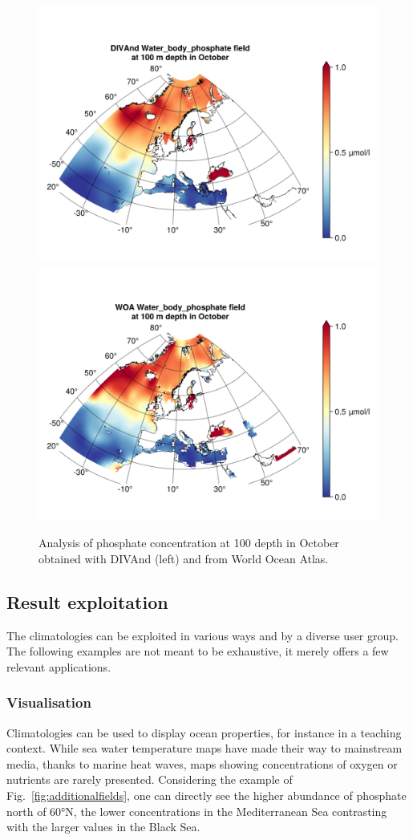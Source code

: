 \documentclass[essd, manuscript]{copernicus}
\begin{document}
\begin{figure}[t]
\includegraphics[width=.49\textwidth]{Water_body_phosphate_depth-100_month-10_DIVAnd}\includegraphics[width=.49\textwidth]{Water_body_phosphate_depth-100_month-10_WOA.png}
\caption{Analysis of phosphate concentration at 100 depth in October obtained with DIVAnd (left) and from World Ocean Atlas.\label{fig:comparisonWOA}}
\end{figure}


\subsection{Result exploitation}

The climatologies can be exploited in various ways and by a diverse user group. The following examples are not meant to be exhaustive, it merely offers a few relevant applications.

\subsubsection{Visualisation}

Climatologies can be used to display ocean properties, for instance in a teaching context. While sea water temperature maps have made their way to mainstream media, thanks to marine heat waves, maps showing concentrations of oxygen or nutrients are rarely presented. Considering the example of Fig.~\ref{fig:additionalfields}, one can directly see the higher abundance of phosphate north of 60°N, the lower concentrations in the Mediterranean Sea contrasting with the larger values in the Black Sea.
\end{document}
